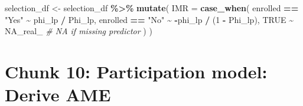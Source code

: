 \documentclass[
]{article}
\newenvironment{Shaded}{\begin{snugshade}}{\end{snugshade}}
\newcommand{\AttributeTok}[1]{\textcolor[rgb]{0.13,0.29,0.53}{#1}}
\newcommand{\CommentTok}[1]{\textcolor[rgb]{0.56,0.35,0.01}{\textit{#1}}}
\newcommand{\ConstantTok}[1]{\textcolor[rgb]{0.56,0.35,0.01}{#1}}
\newcommand{\DecValTok}[1]{\textcolor[rgb]{0.00,0.00,0.81}{#1}}
\newcommand{\FunctionTok}[1]{\textcolor[rgb]{0.13,0.29,0.53}{\textbf{#1}}}
\newcommand{\NormalTok}[1]{#1}
\newcommand{\OtherTok}[1]{\textcolor[rgb]{0.56,0.35,0.01}{#1}}
\newcommand{\SpecialCharTok}[1]{\textcolor[rgb]{0.81,0.36,0.00}{\textbf{#1}}}
\newcommand{\StringTok}[1]{\textcolor[rgb]{0.31,0.60,0.02}{#1}}
\begin{document}
\begin{Shaded}
\begin{Highlighting}[]
\NormalTok{selection\_df }\OtherTok{\textless{}{-}}\NormalTok{ selection\_df }\SpecialCharTok{\%\textgreater{}\%}
  \FunctionTok{mutate}\NormalTok{(}
    \AttributeTok{IMR =} \FunctionTok{case\_when}\NormalTok{(}
\NormalTok{      enrolled }\SpecialCharTok{==} \StringTok{"Yes"} \SpecialCharTok{\textasciitilde{}}\NormalTok{ phi\_lp }\SpecialCharTok{/}\NormalTok{ Phi\_lp,}
\NormalTok{      enrolled }\SpecialCharTok{==} \StringTok{"No"} \SpecialCharTok{\textasciitilde{}} \SpecialCharTok{{-}}\NormalTok{phi\_lp }\SpecialCharTok{/}\NormalTok{ (}\DecValTok{1} \SpecialCharTok{{-}}\NormalTok{ Phi\_lp),}
      \ConstantTok{TRUE} \SpecialCharTok{\textasciitilde{}} \ConstantTok{NA\_real\_} \CommentTok{\# NA if missing predictor}
\NormalTok{      )}
\NormalTok{  )}
\end{Highlighting}
\end{Shaded}

\section*{Chunk 10: Participation model: Derive AME}\label{chunk-10-participation-model-derive-ame}
\end{document}
